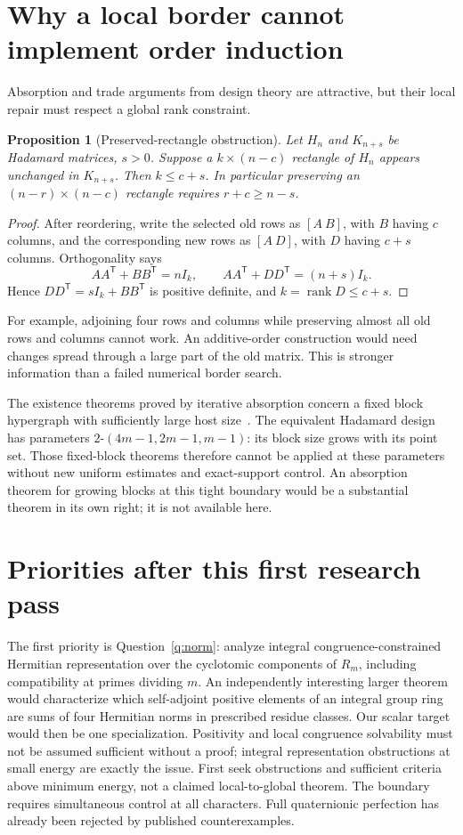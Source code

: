 \documentclass[11pt]{article}
\newtheorem{proposition}{Proposition}[section]
\begin{document}
\section{Why a local border cannot implement order induction}
Absorption and trade arguments from design theory are attractive, but
their local repair must respect a global rank constraint.
\begin{proposition}[Preserved-rectangle obstruction]\label{prop:border}
Let $H_n$ and $K_{n+s}$ be Hadamard matrices, $s>0$. Suppose a
$k\times(n-c)$ rectangle of $H_n$ appears unchanged in $K_{n+s}$.
Then $k\le c+s$. In particular preserving an $(n-r)\times(n-c)$
rectangle requires $r+c\ge n-s$.
\end{proposition}
\begin{proof}
After reordering, write the selected old rows as $[A\ B]$, with
$B$ having $c$ columns, and the corresponding new rows as $[A\ D]$,
with $D$ having $c+s$ columns. Orthogonality says
\[
 AA^{\mathsf T}+BB^{\mathsf T}=nI_k,\qquad
 AA^{\mathsf T}+DD^{\mathsf T}=(n+s)I_k.
\]
Hence $DD^{\mathsf T}=sI_k+BB^{\mathsf T}$ is positive definite,
and $k=\operatorname{rank}D\le c+s$.
\end{proof}
For example, adjoining four rows and columns while preserving almost
all old rows and columns cannot work. An additive-order construction
would need changes spread through a large part of the old matrix.
This is stronger information than a failed numerical border search.

The existence theorems proved by iterative absorption concern a fixed
block hypergraph with sufficiently large host size~\cite{Absorption}.
The equivalent Hadamard design has parameters
$2$-$(4m-1,2m-1,m-1)$: its block size grows with its point set.
Those fixed-block theorems therefore cannot be applied at these
parameters without new uniform estimates and exact-support control.
An absorption theorem for growing blocks at this tight boundary would
be a substantial theorem in its own right; it is not available here.

\section{Priorities after this first research pass}
The first priority is Question~\ref{q:norm}: analyze integral
congruence-constrained Hermitian representation over the cyclotomic
components of $R_m$, including compatibility at primes dividing $m$.
An independently interesting larger theorem would characterize which
self-adjoint positive elements of an integral group ring are sums of
four Hermitian norms in prescribed residue classes. Our scalar target
would then be one specialization. Positivity and local congruence
solvability must not be assumed sufficient without a proof; integral
representation obstructions at small energy are exactly the issue.
First seek obstructions and sufficient criteria above minimum energy,
not a claimed local-to-global theorem. The boundary requires simultaneous
control at all characters. Full quaternionic perfection has already
been rejected by published counterexamples.
\end{document}
